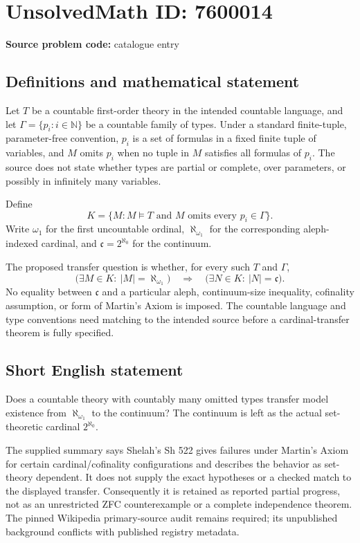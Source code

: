 \documentclass[11pt]{article}
\newcommand{\N}{\mathbb{N}}
\begin{document}
\section*{UnsolvedMath ID: 7600014}
\textbf{Source problem code:} catalogue entry
\subsection{Definitions and mathematical statement}
Let $T$ be a countable first-order theory in the intended countable language, and let $\Gamma=\{p_i:i\in\N\}$ be a countable family of types. Under a standard finite-tuple, parameter-free convention, $p_i$ is a set of formulas in a fixed finite tuple of variables, and $M$ omits $p_i$ when no tuple in $M$ satisfies all formulas of $p_i$. The source does not state whether types are partial or complete, over parameters, or possibly in infinitely many variables.

Define
\[
 K=\{M:M\models T\text{ and }M\text{ omits every }p_i\in\Gamma\}.
\]
Write $\omega_1$ for the first uncountable ordinal, $\aleph_{\omega_1}$ for the corresponding aleph-indexed cardinal, and $\mathfrak c=2^{\aleph_0}$ for the continuum.

The proposed transfer question is whether, for every such $T$ and $\Gamma$,
\[
 \bigl(\exists M\in K:\ |M|=\aleph_{\omega_1}\bigr)
 \quad\Longrightarrow\quad
 \bigl(\exists N\in K:\ |N|=\mathfrak c\bigr).
\]
No equality between $\mathfrak c$ and a particular aleph, continuum-size inequality, cofinality assumption, or form of Martin's Axiom is imposed. The countable language and type conventions need matching to the intended source before a cardinal-transfer theorem is fully specified.
\subsection{Short English statement}
Does a countable theory with countably many omitted types transfer model existence from $\aleph_{\omega_1}$ to the continuum? The continuum is left as the actual set-theoretic cardinal $2^{\aleph_0}$.

The supplied summary says Shelah's Sh 522 gives failures under Martin's Axiom for certain cardinal/cofinality configurations and describes the behavior as set-theory dependent. It does not supply the exact hypotheses or a checked match to the displayed transfer. Consequently it is retained as reported partial progress, not as an unrestricted ZFC counterexample or a complete independence theorem. The pinned Wikipedia primary-source audit remains required; its unpublished background conflicts with published registry metadata.
\end{document}
